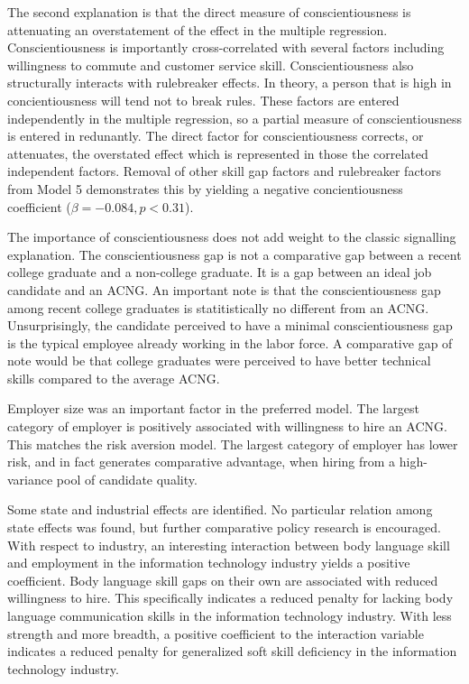 \documentclass[review]{elsarticle}
\begin{document}
The second explanation is that the direct measure of conscientiousness is attenuating an overstatement of the effect in the multiple regression.
Conscientiousness is importantly cross-correlated with several factors including willingness to commute and customer service skill.
Conscientiousness also structurally interacts with rulebreaker effects.
In theory, a person that is high in concientiousness will tend not to break rules.
These factors are entered independently in the multiple regression, so a partial measure of conscientiousness is entered in redunantly.
The direct factor for conscientiousness corrects, or attenuates, the overstated effect which is represented in those the correlated independent factors.
Removal of other skill gap factors and rulebreaker factors from Model 5 demonstrates this by yielding a negative concientiousness coefficient ($\beta = -0.084, p < 0.31$).

The importance of conscientiousness does not add weight to the classic signalling explanation.
The conscientiousness gap is not a comparative gap between a recent college graduate and a non-college graduate.
It is a gap between an ideal job candidate and an ACNG.
An important note is that the conscientiousness gap among recent college graduates is statitistically no different from an ACNG.
Unsurprisingly, the candidate perceived to have a minimal conscientiousness gap is the typical employee already working in the labor force.
A comparative gap of note would be that college graduates were perceived to have better technical skills compared to the average ACNG.

Employer size was an important factor in the preferred model.
The largest category of employer is positively associated with willingness to hire an ACNG.
This matches the risk aversion model.
The largest category of employer has lower risk, and in fact generates comparative advantage, when hiring from a high-variance pool of candidate quality.

Some state and industrial effects are identified.
No particular relation among state effects was found, but further comparative policy research is encouraged.
With respect to industry, an interesting interaction between body language skill and employment in the information technology industry yields a positive coefficient.
Body language skill gaps on their own are associated with reduced willingness to hire.
This specifically indicates a reduced penalty for lacking body language communication skills in the information technology industry.
With less strength and more breadth, a positive coefficient to the interaction variable indicates a reduced penalty for generalized soft skill deficiency in the information technology industry.
\end{document}
